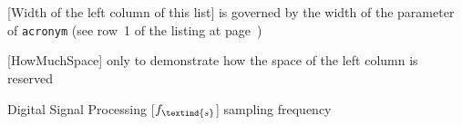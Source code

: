 \cleardoublepage
\chapter*{\listofabbrevname}
{}

\begin{acronym}[HowMuchSpace]

		[Width of the left column of this list]								%
		{is governed by the width of the parameter of \texttt{acronym} (see row~1 of the listing at page~\pageref{lst:abbrevs})}

		[HowMuchSpace]
		{only to demonstrate how the space of the left column is reserved}

		{Digital Signal Processing}
		[\ensuremath{f_\textind{s}}]  %
		{sampling frequency}					%

\end{acronym}